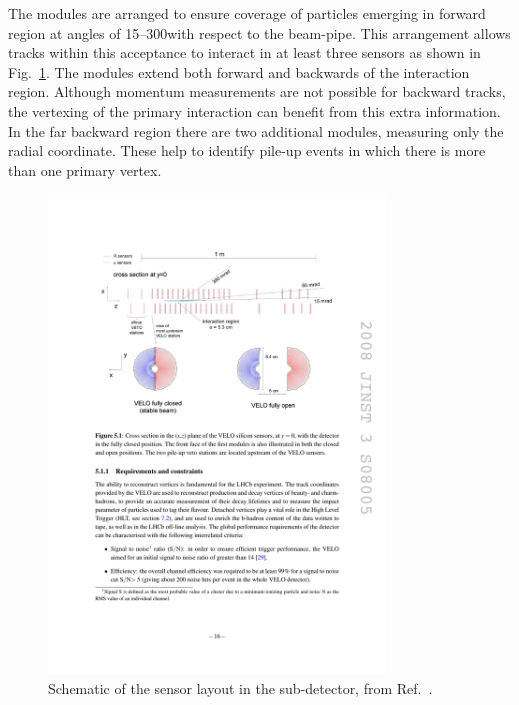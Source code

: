 The \velo modules are arranged to ensure coverage of particles emerging in forward region at angles of 15--300\mrad with respect to the beam-pipe. This arrangement allows tracks within this acceptance to interact in at least three sensors as shown in Fig.~\ref{fig:Dec_velo_sensor_layout}.   
The modules extend both forward and backwards of the interaction region. Although momentum measurements are not possible for backward tracks, the vertexing of the primary interaction can benefit from this extra information. In the far backward region there are two additional modules, measuring only the radial coordinate. These help to identify pile-up events in which there is more than one primary vertex. 

\begin{figure}[!h]
    \centering
    \includegraphics[width=0.8\textwidth]{figs/Detector/velo_sensor_layout.pdf}
    \caption{Schematic of the sensor layout in the \velo sub-detector, from Ref.~\cite{LHCb-DP-2014-001}.}
    \label{fig:Dec_velo_sensor_layout}   
\end{figure}

